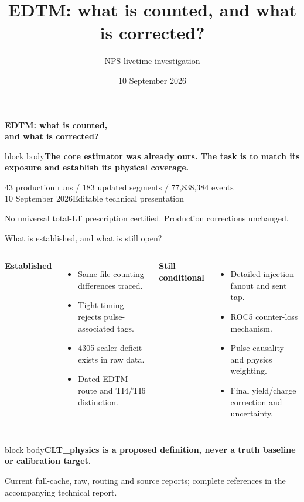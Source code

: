 \documentclass[aspectratio=169,11pt]{beamer}
\title{EDTM: what is counted, and what is corrected?}
\author{NPS livetime investigation}
\date{10 September 2026}
\newcommand{\source}[1]{\par\vfill{\scriptsize\color{muted}#1\par}}
\newcommand{\takeaway}[1]{\begin{beamercolorbox}[sep=2.5mm,wd=\linewidth]{block body}\textbf{#1}\end{beamercolorbox}}
\begin{document}
\begin{frame}[plain]
\par\vspace{5mm}
{\LARGE\bfseries EDTM: what is counted,\\and what is corrected?\par}
\vspace{4mm}{\large KinC\_x60\_4b LH$_2$\quad Complete investigation update}
\vspace{5mm}\takeaway{The core estimator was already ours. The task is to match its exposure and establish its physical coverage.}
\vfill\small 43 production runs / 183 updated segments / 77,838,384 events\\
10 September 2026\quad Editable technical presentation
\par\vspace{2mm}\scriptsize No universal total-LT prescription certified. Production corrections unchanged.
\end{frame}

\begin{frame}{What is established, and what is still open?}
\begin{columns}[T]
\textbf{Established}
\begin{itemize}\setlength\itemsep{3mm}
\item Same-file counting differences traced.
\item Tight timing rejects pulse-associated tags.
\item 4305 scaler deficit exists in raw data.
\item Dated EDTM route and TI4/TI6 distinction.
\end{itemize}
\textbf{Still conditional}
\begin{itemize}\setlength\itemsep{3mm}
\item Detailed injection fanout and sent tap.
\item ROC5 counter-loss mechanism.
\item Pulse causality and physics weighting.
\item Final yield/charge correction and uncertainty.
\end{itemize}
\end{columns}\vspace{4mm}
\takeaway{CLT\_physics is a proposed definition, never a truth baseline or calibration target.}
\source{Current full-cache, raw, routing and source reports; complete references in the accompanying technical report.}
\end{frame}
\end{document}
